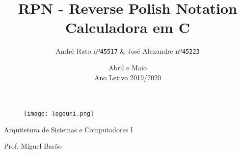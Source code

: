 \documentclass[12pt, a4paper]{article}
\begin{document}
    \clearpage
    \begin{figure}
        \centering
        \texttt{[image: logouni.png]}
    \end{figure}

    \title{RPN - Reverse Polish Notation\\Calculadora em C}

    \author{André Rato nº\texttt{45517} & José Alexandre nº\texttt{45223}}

    \date{Abril e Maio\\Ano Letivo 2019/2020}

    \maketitle
    \begin{description}
        \centering
        \item Arquitetura de Sistemas e Computadores I
        \item Prof. Miguel Barão
    \end{description}

    \thispagestyle{empty}
    \newpage
    
    
    \renewcommand{\contentsname}{Índice}
    \tableofcontents
    \newpage

\end{document}
